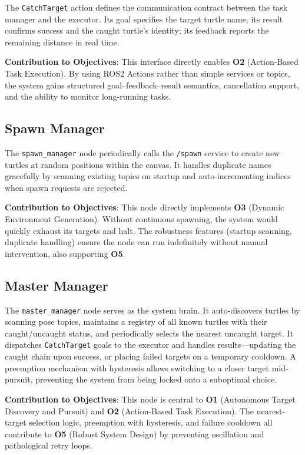 The \texttt{CatchTarget} action defines the communication contract between the task manager and the executor. Its goal specifies the target turtle name; its result confirms success and the caught turtle's identity; its feedback reports the remaining distance in real time.

\textbf{Contribution to Objectives}: This interface directly enables \textbf{O2} (Action-Based Task Execution). By using ROS2 Actions rather than simple services or topics, the system gains structured goal--feedback--result semantics, cancellation support, and the ability to monitor long-running tasks.

\subsection{Spawn Manager}

The \texttt{spawn\_manager} node periodically calls the \texttt{/spawn} service to create new turtles at random positions within the canvas. It handles duplicate names gracefully by scanning existing topics on startup and auto-incrementing indices when spawn requests are rejected.

\textbf{Contribution to Objectives}: This node directly implements \textbf{O3} (Dynamic Environment Generation). Without continuous spawning, the system would quickly exhaust its targets and halt. The robustness features (startup scanning, duplicate handling) ensure the node can run indefinitely without manual intervention, also supporting \textbf{O5}.

\subsection{Master Manager}

The \texttt{master\_manager} node serves as the system brain. It auto-discovers turtles by scanning pose topics, maintains a registry of all known turtles with their caught/uncaught status, and periodically selects the nearest uncaught target. It dispatches \texttt{CatchTarget} goals to the executor and handles results---updating the caught chain upon success, or placing failed targets on a temporary cooldown. A preemption mechanism with hysteresis allows switching to a closer target mid-pursuit, preventing the system from being locked onto a suboptimal choice.

\textbf{Contribution to Objectives}: This node is central to \textbf{O1} (Autonomous Target Discovery and Pursuit) and \textbf{O2} (Action-Based Task Execution). The nearest-target selection logic, preemption with hysteresis, and failure cooldown all contribute to \textbf{O5} (Robust System Design) by preventing oscillation and pathological retry loops.

